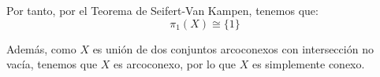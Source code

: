 \begin{ejercicio}
\begin{enumerate}[label=\alph*)]
            Por tanto, por el Teorema de Seifert-Van Kampen, tenemos que:
            \begin{equation*}
                \pi_1(X) \cong \{1\}
            \end{equation*}

            Además, como $X$ es unión de dos conjuntos arcoconexos con intersección no vacía, tenemos que $X$ es arcoconexo, por lo que $X$ es simplemente conexo.

\end{enumerate}
\end{ejercicio}
